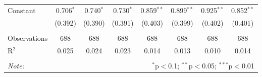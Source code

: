\documentclass[12pt]{article}
\begin{document}
\begin{table}[!htbp]
\begin{tabular}{@{\extracolsep{5pt}}lccccccc}
		 Constant & 0.706$^{*}$ & 0.740$^{*}$ & 0.730$^{*}$ & 0.859$^{**}$ & 0.899$^{**}$ & 0.925$^{**}$ & 0.852$^{**}$ \\ 
		  & (0.392) & (0.390) & (0.391) & (0.403) & (0.399) & (0.402) & (0.401) \\ 
		\hline \\[-1.8ex] 
		Observations & 688 & 688 & 688 & 688 & 688 & 688 & 688 \\ 
		R$^{2}$ & 0.025 & 0.024 & 0.023 & 0.014 & 0.013 & 0.010 & 0.014 \\ 
		\hline 
		\hline \\[-1.8ex] 
		\textit{Note:}  & \multicolumn{7}{r}{$^{*}$p$<$0.1; $^{**}$p$<$0.05; $^{***}$p$<$0.01} \\ 
		\end{tabular} 
	\end{table} 
\end{document}

